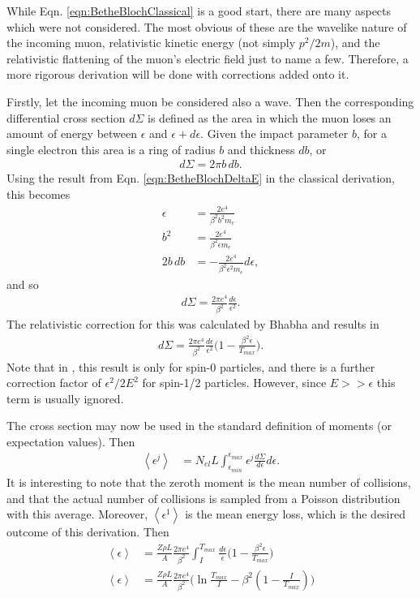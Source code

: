 While Eqn. \ref{eqn:BetheBlochClassical} is a good start, there are many aspects which were not considered. The most obvious of these are the wavelike nature of the incoming muon, relativistic kinetic energy (not simply $p^2/2m$), and the relativistic flattening of the muon's electric field just to name a few. Therefore, a more rigorous derivation will be done with corrections added onto it.

Firstly, let the incoming muon be considered also a wave. Then the corresponding differential cross section $d\Sigma$ is defined as the area in which the muon loses an amount of energy between $\epsilon$ and $\epsilon+d\epsilon$. Given the impact parameter $b$, for a single electron this area is a ring of radius $b$ and thickness $db$, or \cite{bichsel1968,bichsel1988}
\begin{align*}
d\Sigma=2\pi b \, db.
\end{align*}
Using the result from Eqn. \ref{eqn:BetheBlochDeltaE} in the classical derivation, this becomes
\begin{align*}
\epsilon &= \frac{2e^4}{\beta^2 b^2 m_e}\\
b^2 &= \frac{2e^4}{\beta^2 \epsilon m_e}\\
2b \, db &= -\frac{2e^4}{\beta^2 \epsilon^2 m_e}d\epsilon,
\end{align*}
and so
\begin{align*}
d\Sigma=\frac{2\pi e^4}{\beta^2} \frac{d\epsilon}{\epsilon ^2}.
\end{align*}
The relativistic correction for this was calculated by Bhabha \cite{uehling,bhabha} and results in
\begin{align*}
d\Sigma=\frac{2\pi e^4}{\beta^2} \frac{d\epsilon}{\epsilon ^2}\Big(1-\frac{\beta^2 \epsilon}{T_{max}}\Big).
\end{align*}
Note that in \cite{uehling}, this result is only for spin-0 particles, and there is a further correction factor of $\epsilon ^2 / 2E^2$ for spin-1/2 particles. However, since $E>>\epsilon$ this term is usually ignored.

The cross section may now be used in the standard definition of moments (or expectation values). Then
\begin{align} \label{eqn:StragglingMoments}
\left<\epsilon^j\right>&=N_{el} L \int_{\epsilon_{min}} ^{\epsilon_{max}} \epsilon^j \frac{d\Sigma}{d\epsilon} d\epsilon .
\end{align}
It is interesting to note that the zeroth moment is the mean number of collisions, and that the actual number of collisions is sampled from a Poisson distribution with this average. Moreover, $\left<\epsilon^1\right>$ is the mean energy loss, which is the desired outcome of this derivation. Then
\begin{align*}
\left<\epsilon\right>&=\frac{Z\rho L}{A} \frac{2\pi e^4}{\beta^2} \int_I ^{T_{max}} \frac{d\epsilon}{\epsilon} \Big(1-\frac{\beta^2 \epsilon}{T_{max}}\Big)\\
\left<\epsilon\right>&=\frac{Z\rho L}{A} \frac{2\pi e^4}{\beta^2} \Big(\ln{\frac{T_{max}}{I}}-\beta^2 (1-\frac{I}{T_{max}})\Big)
\end{align*}







